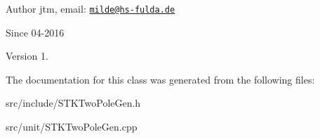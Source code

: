 \begin{DoxyAuthor}{Author}
jtm, email\-:  \href{mailto:milde@hs-fulda.de}{\tt milde@hs-\/fulda.\-de} 
\end{DoxyAuthor}
\begin{DoxySince}{Since}
04-\/2016 
\end{DoxySince}
\begin{DoxyVersion}{Version}
1. 
\end{DoxyVersion}


The documentation for this class was generated from the following files\-:\begin{DoxyCompactItemize}
\item 
src/include/S\-T\-K\-Two\-Pole\-Gen.\-h\item 
src/unit/S\-T\-K\-Two\-Pole\-Gen.\-cpp\end{DoxyCompactItemize}
